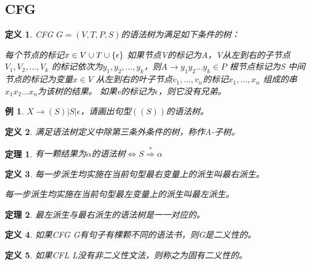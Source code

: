 \documentclass{ctexart}
\newtheorem{definition}{定义}[section]
\newtheorem{example}{例}[section]
\newtheorem{theorem}{定理}[section]
\DeclarePairedDelimiter{\set}{\{}{\}}
\begin{document}
\subsection{CFG}
\begin{definition}
    CFG $G=(V, T, P, S)$的语法树为满足如下条件的树：

    \begin{outline}[enumerate]
        \1 每个节点的标记$x \in V \cup T \cup \set{\epsilon}$
        \1 如果节点V的标记为$A$，V从左到右的子节点$V_1,V_2,\dots,V_k$
        的标记依次为$y_1,y_2,\dots,y_k$，则$A \to y_1y_2\dots y_k \in P$
        \1 根节点标记为S
        \1 中间节点的标记为变量$x \in V$
        \1 从左到右的叶子节点$v_1,\dots,v_n$的标记$x_1,\dots,x_n$
        组成的串$x_1x_2\dots x_n$为该树的结果。
        \1 如果v的标记为$\epsilon$，则它没有兄弟。
    \end{outline}
\end{definition}
\begin{example}
    $X \to (S) | S | \epsilon$，请画出句型$((S))$的语法树。
\end{example}
\begin{definition}
    满足语法树定义中除第三条外条件的树，称作A-子树。
\end{definition}
\begin{theorem}
    有一颗结果为$\alpha$的语法树$\iff S \overset{*} \Rightarrow \alpha $
\end{theorem}
\begin{definition}
    每一步派生均实施在当前句型最右变量上的派生叫最右派生。

    每一步派生均实施在当前句型最左变量上的派生叫最左派生。
\end{definition}
\begin{theorem}
    最左派生与最右派生的语法树是一一对应的。
\end{theorem}
\begin{definition}
    如果CFG G有句子有棵颗不同的语法书，则G是二义性的。
\end{definition}
\begin{definition}
    如果CFL L没有非二义性文法，则称之为固有二义性的。
\end{definition}
\end{document}
